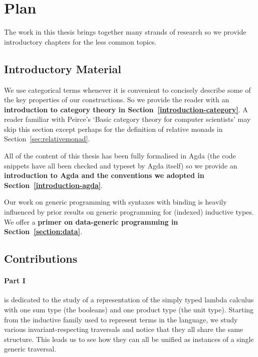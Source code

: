 \section{Plan}

The work in this thesis brings together many strands of research so we provide
introductory chapters for the less common topics.

\subsection{Introductory Material}

We use categorical terms whenever it is convenient to concisely describe some
of the key properties of our constructions. So we provide the reader with an
\textbf{introduction to category theory in Section~\ref{introduction-category}}.
A reader familiar with Peirce's `Basic category theory for computer scientists'
may skip this section except perhaps for the definition of relative monads
in Section~\ref{sec:relativemonad}.


All of the content of this thesis has been fully formalised in Agda
(the code snippets have all been checked and typeset by Agda itself)
so we provide an \textbf{introduction to Agda and the conventions we
adopted in Section~\ref{introduction-agda}}.

Our work on generic programming with syntaxes with binding is heavily influenced
by prior results on generic programming for (indexed) inductive types. We offer
a \textbf{primer on data-generic programming in Section~\ref{section:data}}.

\subsection{Contributions}

\paragraph{Part I} is dedicated to the study of a \scopeandtypesafe{}
representation of the simply typed lambda calculus with one sum type
(the booleans) and one product type (the unit type).
%
Starting from the inductive family used to represent terms in the language,
we study various invariant-respecting traversals and notice that they all
share the same structure. This leads us to see how they can all be unified
as instances of a single generic traversal.

